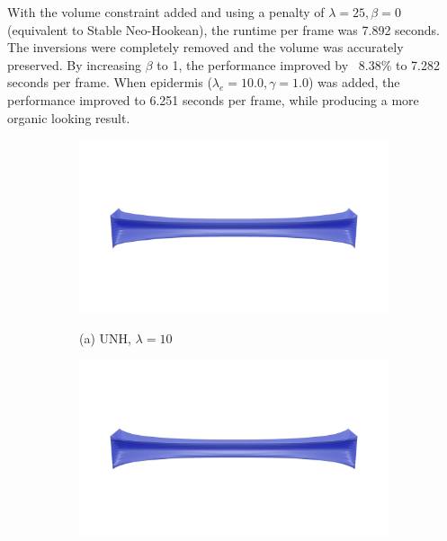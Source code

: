 With the volume constraint added and using a penalty of $\lambda = 25, \beta = 0$ (equivalent to Stable Neo-Hookean), the runtime per frame was 7.892 seconds. The inversions were completely removed and the volume was accurately preserved. By increasing $\beta$ to 1, the performance improved by ~8.38\% to 7.282 seconds per frame. When epidermis ($\lambda_e = 10.0, \gamma = 1.0$) was added, the performance improved to 6.251 seconds per frame, while producing a more organic looking result.

\begin{figure}
	\centering
	\begin{subfigure}{1.0\linewidth}
		\centering
		{\includegraphics[width=1.0\textwidth]{images/cube_stretch/pr04545.jpg}}
		\caption*{(a) UNH, $\lambda = 10$}
		\label{sfig:stretch-snh10}
	\end{subfigure}\par\medskip
	\begin{subfigure}{1.0\linewidth}
		\centering
		{\includegraphics[width=1.0\textwidth]{images/cube_stretch/pr0495.jpg}}

\end{subfigure}
\end{figure}
